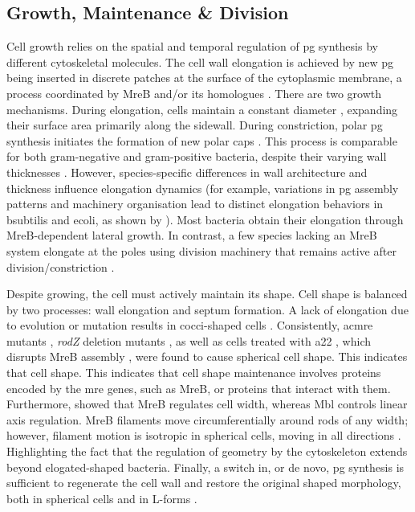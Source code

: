 
\subsection{Growth, Maintenance \& Division}

Cell growth relies on the spatial and temporal regulation of \ac{pg} synthesis by
different cytoskeletal molecules. The cell wall elongation is achieved by new \ac{pg}
being inserted in discrete patches at the surface of the cytoplasmic membrane, a process
coordinated by MreB and/or its homologues \cite{DePedro2003}. There are two growth
mechanisms. During elongation, cells maintain a constant diameter \cite{Billaudeau2017},
expanding their surface area primarily along the sidewall. During constriction, polar
\ac{pg} synthesis initiates the formation of new polar caps \cite{Cooper1991,
Wang2010_2}. This process is comparable for both gram-negative and gram-positive
bacteria, despite their varying wall thicknesses \cite{Chang2014}. However,
species-specific differences in wall architecture and thickness influence elongation
dynamics (for example, variations in \ac{pg} assembly patterns and machinery organisation
    lead to distinct elongation behaviors in \ac{bsubtilis} and \ac{ecoli}, as shown by
\cite{Billaudeau2017}). Most bacteria obtain their elongation through MreB-dependent
lateral growth. In contrast, a few species lacking an MreB system elongate at the poles
using division machinery that remains active after division/constriction \cite{Daniel2003}.

Despite growing, the cell must actively maintain its shape. Cell shape is balanced by two
processes: wall elongation and septum formation. A lack of elongation due to evolution or
mutation results in cocci-shaped cells \cite{Lleo1990}. Consistently, ac{mre} mutants
\cite{Wachi1987}, \textit{rodZ} deletion mutants \cite{Shiomi2008}, as well as cells
treated with \ac{a22} \cite{IWAI2002}, which disrupts MreB assembly \cite{Bean2009}, were
found to cause spherical cell shape. This indicates that cell shape. This indicates that
cell shape maintenance involves proteins encoded by the \ac{mre}  genes, such as MreB, or
proteins that interact with them.
Furthermore, \cite{Jones2001}  showed that MreB regulates cell width, whereas Mbl
controls linear axis regulation. MreB filaments move circumferentially around rods of any
width; however, filament motion is isotropic in spherical cells, moving in all directions
\cite{Garner2021}. Highlighting the fact that the regulation of geometry by the
cytoskeleton extends beyond elogated-shaped bacteria.
Finally, a switch in, or de novo, \ac{pg} synthesis is sufficient to regenerate the cell
wall and restore the original shaped morphology, both in spherical cells \cite{Huan2021}
and in L-forms \cite{Kawai2014}.

